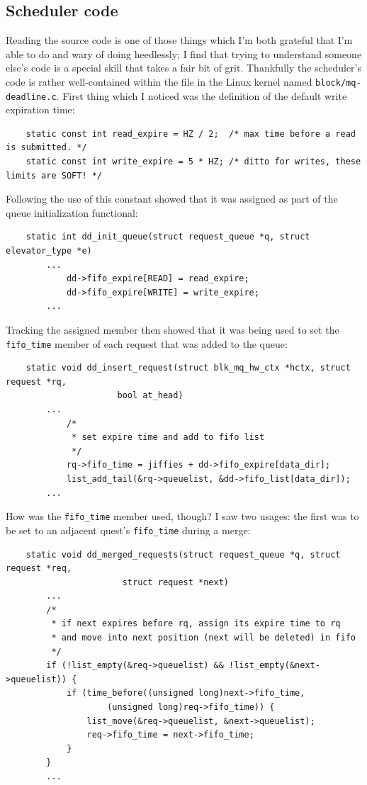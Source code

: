 \documentclass{article}
\begin{document}
\subsection{Scheduler code}
Reading the source code is one of those things which I'm both grateful that I'm able to do and wary of doing heedlessly; I find that trying to understand someone else's code is a special skill that takes a fair bit of grit.  Thankfully the scheduler's code is rather well-contained within the file in the Linux kernel named \texttt{block/mq-deadline.c}.  First thing which I noticed was the definition of the default write expiration time:
\begin{verbatim}
	static const int read_expire = HZ / 2;  /* max time before a read is submitted. */
	static const int write_expire = 5 * HZ; /* ditto for writes, these limits are SOFT! */
\end{verbatim}
Following the use of this constant showed that it was assigned as part of the queue initialization functional:
\begin{verbatim}
	static int dd_init_queue(struct request_queue *q, struct elevator_type *e)
		...
	        dd->fifo_expire[READ] = read_expire;
	        dd->fifo_expire[WRITE] = write_expire;
		...
\end{verbatim}
Tracking the assigned member then showed that it was being used to set the \texttt{fifo_time} member of each request that was added to the queue:
\begin{verbatim}
	static void dd_insert_request(struct blk_mq_hw_ctx *hctx, struct request *rq,
				      bool at_head)
		...
			/*
			 * set expire time and add to fifo list
			 */
			rq->fifo_time = jiffies + dd->fifo_expire[data_dir];
			list_add_tail(&rq->queuelist, &dd->fifo_list[data_dir]);
		...
\end{verbatim}
How was the \texttt{fifo_time} member used, though?  I saw two usages: the first was to be set to an adjacent quest's \texttt{fifo_time} during a merge:
\begin{verbatim}
	static void dd_merged_requests(struct request_queue *q, struct request *req,
				       struct request *next)
		...
		/*
		 * if next expires before rq, assign its expire time to rq
		 * and move into next position (next will be deleted) in fifo
		 */
		if (!list_empty(&req->queuelist) && !list_empty(&next->queuelist)) {
			if (time_before((unsigned long)next->fifo_time,
					(unsigned long)req->fifo_time)) {
				list_move(&req->queuelist, &next->queuelist);
				req->fifo_time = next->fifo_time;
			}
		}
		...
\end{verbatim}
\end{document}
